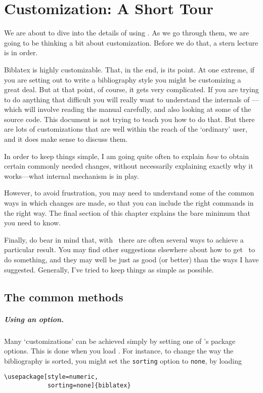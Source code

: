 \chapter{Customization: A Short Tour}\label{ch:customize1}

We are about to dive into the details of using \biblatex. As we go
through them, we are going to be thinking a bit about
customization. Before we do that, a stern lecture is in order.

\textsf{Biblatex} is highly customizable. That, in the end, is its
point. At one extreme, if you are setting out to write a bibliography
style you might be customizing a great deal. But at that point, of
course, it gets very complicated. If you are trying to do anything
that difficult you will really want to understand the internals of
\biblatex---which will involve reading the manual
carefully, and also looking at some of the
source code. This document is not trying to teach you how to do that. But
there are lots of customizations that are well within the reach of the
`ordinary' user, and it does make sense to discuss them.

In order to keep things simple, I am going quite often to explain
\emph{how} to obtain certain commonly needed changes, without
necessarily explaining exactly why it works---what internal mechanism
is in play.

However, to avoid frustration, you may need to understand some of the
common ways in which changes are made, so that you can include the
right commands in the right way. The final section of this chapter
explains the bare minimum that you need to know.

Finally, do bear in mind that, with \biblatex\ there are often several
ways to achieve a particular result. You may find other suggestions
elsewhere about how to get \biblatex\ to do something, and they may
well be just as good (or better) than the ways I have
suggested. Generally, I've tried to keep things as simple as possible.

\section{The common methods}

\paragraph{Using an option.}
Many `customizations' can be achieved simply by setting one of
\biblatex's package options. This is done when you load \biblatex. For
instance, to change the way the bibliography is sorted, you might set
the \verb|sorting| option to \verb|none|, by loading
\begin{verbatim}
\usepackage[style=numeric,
            sorting=none]{biblatex}
\end{verbatim}

